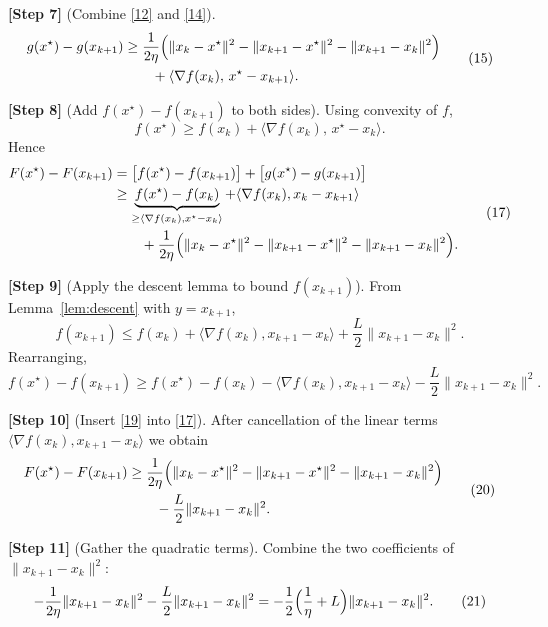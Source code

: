 \documentclass[11pt]{article}
\begin{document}
\noindent\textbf{[Step 7]} (Combine \eqref{12} and \eqref{14}).  
\[
\begin{aligned}
g(x^{\star})-g(x_{k+1})
&\ge \frac{1}{2\eta}\Bigl(\|x_{k}-x^{\star}\|^{2}
      -\|x_{k+1}-x^{\star}\|^{2}
      -\|x_{k+1}-x_{k}\|^{2}\Bigr) \\
&\qquad +\langle \nabla f(x_{k}),\,x^{\star}-x_{k+1}\rangle .
\end{aligned}
\tag{15}
\]

\noindent\textbf{[Step 8]} (Add $f(x^{\star})-f(x_{k+1})$ to both sides).  
Using convexity of $f$,
\[
f(x^{\star})\ge f(x_{k})+\langle \nabla f(x_{k}),\,x^{\star}-x_{k}\rangle .
\tag{16}
\]
Hence
\[
\begin{aligned}
F(x^{\star})-F(x_{k+1})
&= \bigl[f(x^{\star})-f(x_{k+1})\bigr] + \bigl[g(x^{\star})-g(x_{k+1})\bigr] \\
&\ge \underbrace{f(x^{\star})-f(x_{k})}_{\ge \langle \nabla f(x_{k}),x^{\star}-x_{k}\rangle}
    +\langle \nabla f(x_{k}),x_{k}-x_{k+1}\rangle  \\
&\qquad +\frac{1}{2\eta}\Bigl(\|x_{k}-x^{\star}\|^{2}
      -\|x_{k+1}-x^{\star}\|^{2}
      -\|x_{k+1}-x_{k}\|^{2}\Bigr) .
\end{aligned}
\tag{17}
\]

\noindent\textbf{[Step 9]} (Apply the descent lemma to bound $f(x_{k+1})$).  
From Lemma~\ref{lem:descent} with $y=x_{k+1}$,
\[
f(x_{k+1})\le f(x_{k})+\langle \nabla f(x_{k}),x_{k+1}-x_{k}\rangle
          +\frac{L}{2}\|x_{k+1}-x_{k}\|^{2}.
\tag{18}
\]
Rearranging,
\[
f(x^{\star})-f(x_{k+1})
\ge f(x^{\star})-f(x_{k})-\langle \nabla f(x_{k}),x_{k+1}-x_{k}\rangle
      -\frac{L}{2}\|x_{k+1}-x_{k}\|^{2}.
\tag{19}
\]

\noindent\textbf{[Step 10]} (Insert \eqref{19} into \eqref{17}).  
After cancellation of the linear terms $\langle \nabla f(x_{k}),x_{k+1}-x_{k}\rangle$ we obtain
\[
\begin{aligned}
F(x^{\star})-F(x_{k+1})
&\ge \frac{1}{2\eta}\Bigl(\|x_{k}-x^{\star}\|^{2}
      -\|x_{k+1}-x^{\star}\|^{2}
      -\|x_{k+1}-x_{k}\|^{2}\Bigr) \\
&\qquad -\frac{L}{2}\|x_{k+1}-x_{k}\|^{2}.
\end{aligned}
\tag{20}
\]

\noindent\textbf{[Step 11]} (Gather the quadratic terms).  
Combine the two coefficients of $\|x_{k+1}-x_{k}\|^{2}$:
\[
-\frac{1}{2\eta}\|x_{k+1}-x_{k}\|^{2}-\frac{L}{2}\|x_{k+1}-x_{k}\|^{2}
= -\frac{1}{2}\Bigl(\frac{1}{\eta}+L\Bigr)\|x_{k+1}-x_{k}\|^{2}.
\tag{21}
\]
\end{document}
